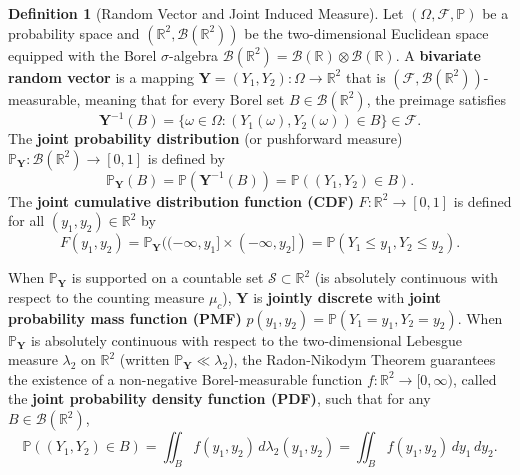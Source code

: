 \documentclass[11pt, letterpaper]{article}
\theoremstyle{definition}
\newtheorem{definition}{Definition}[section]
\theoremstyle{remark}
\newcommand{\Prob}{\mathbb{P}}
\newcommand{\F}{\mathcal{F}}
\begin{document}
\begin{definition}[Random Vector and Joint Induced Measure]
Let $(\Omega, \F, \Prob)$ be a probability space and $(\mathbb{R}^2, \mathcal{B}(\mathbb{R}^2))$ be the two-dimensional Euclidean space equipped with the Borel $\sigma$-algebra $\mathcal{B}(\mathbb{R}^2) = \mathcal{B}(\mathbb{R}) \otimes \mathcal{B}(\mathbb{R})$. A \textbf{bivariate random vector} is a mapping $\mathbf{Y} = (Y_1, Y_2) : \Omega \to \mathbb{R}^2$ that is $(\F, \mathcal{B}(\mathbb{R}^2))$-measurable, meaning that for every Borel set $B \in \mathcal{B}(\mathbb{R}^2)$, the preimage satisfies
\[ \mathbf{Y}^{-1}(B) = \{\omega \in \Omega : (Y_1(\omega), Y_2(\omega)) \in B\} \in \F. \]
The \textbf{joint probability distribution} (or pushforward measure) $\Prob_{\mathbf{Y}} : \mathcal{B}(\mathbb{R}^2) \to [0, 1]$ is defined by
\[ \Prob_{\mathbf{Y}}(B) = \Prob(\mathbf{Y}^{-1}(B)) = \Prob((Y_1, Y_2) \in B). \]
The \textbf{joint cumulative distribution function (CDF)} $F : \mathbb{R}^2 \to [0, 1]$ is defined for all $(y_1, y_2) \in \mathbb{R}^2$ by
\[ F(y_1, y_2) = \Prob_{\mathbf{Y}}((-\infty, y_1] \times (-\infty, y_2]) = \Prob(Y_1 \le y_1, Y_2 \le y_2). \]
\end{definition}

When $\Prob_{\mathbf{Y}}$ is supported on a countable set $\mathcal{S} \subset \mathbb{R}^2$ (is absolutely continuous with respect to the counting measure $\mu_c$), $\mathbf{Y}$ is \textbf{jointly discrete} with \textbf{joint probability mass function (PMF)} $p(y_1, y_2) = \Prob(Y_1 = y_1, Y_2 = y_2)$. When $\Prob_{\mathbf{Y}}$ is absolutely continuous with respect to the two-dimensional Lebesgue measure $\lambda_2$ on $\mathbb{R}^2$ (written $\Prob_{\mathbf{Y}} \ll \lambda_2$), the Radon-Nikodym Theorem guarantees the existence of a non-negative Borel-measurable function $f : \mathbb{R}^2 \to [0, \infty)$, called the \textbf{joint probability density function (PDF)}, such that for any $B \in \mathcal{B}(\mathbb{R}^2)$,
\[ \Prob((Y_1, Y_2) \in B) = \iint_B f(y_1, y_2) \, d\lambda_2(y_1, y_2) = \iint_B f(y_1, y_2) \, dy_1 \, dy_2. \]
\end{document}
